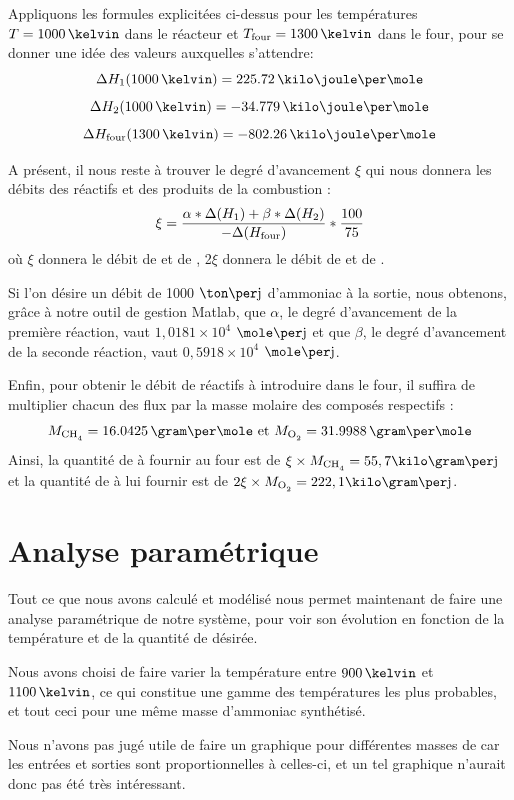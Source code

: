 Appliquons les formules explicitées ci-dessus pour les températures $T=1000\,\kelvin$
dans le réacteur et $T\ind{four} = 1300\,\kelvin$ dans le four,
pour se donner une idée des valeurs auxquelles s'attendre:
$$\Delta H_1 (1000\,\kelvin) = 225.72\,\kilo\joule\per\mole$$
$$\Delta H_2 (1000\,\kelvin) = -34.779\,\kilo\joule\per\mole$$
$$\Delta H\ind{four} (1300\,\kelvin) = -802.26\,\kilo\joule\per\mole$$

A présent, il nous reste à trouver le degré d'avancement $\xi$
qui nous donnera les débits des réactifs et des produits de la combustion :
$$\xi = \frac{\alpha * \Delta (H_1) + \beta * \Delta (H_2)}{-\Delta (H_{\mbox{\scriptsize{four}}})}*\frac{100}{75}$$
où $\xi$ donnera le débit de  et de ,
2$\xi$ donnera le débit de  et de .

Si l'on désire un débit de 1000 $\ton\per\jour$ d'ammoniac à la sortie,  nous obtenons, grâce à notre outil de gestion Matlab, que  $\alpha$, le degré d'avancement de la première réaction, vaut $1,0181\times10^4$ $\mole\per\jour$ et que $\beta$, le degré d'avancement de la seconde réaction, vaut $0,5918\times10^4$ $\mole\per\jour$.

Enfin, pour obtenir le débit de réactifs à introduire dans le four,
il suffira de multiplier chacun des flux par la masse molaire des composés respectifs :
\begin{equation*}
M_{\ce{CH4}}=16.0425\,\gram\per\mole \mbox{ et } M_{\ce{O2}}=31.9988\,\gram\per\mole
\end{equation*}
Ainsi, la quantité de  à fournir au four est de $\xi \times M_{\ce{CH4}} = 55,7  \kilo\gram\per\jour$
\\et la quantité de  à lui fournir est de $2\xi \times M_{\ce{O2}} = 222,1 \kilo\gram\per\jour$.

\section{Analyse paramétrique}

Tout ce que nous avons calculé et modélisé nous permet maintenant de faire une analyse paramétrique de notre système, pour voir son évolution en fonction de la température et de la quantité de  désirée.

Nous avons choisi de faire varier la température entre $900\,\kelvin$ et $1100\,\kelvin$, ce qui constitue une gamme des températures les plus probables, et tout ceci pour une même masse d'ammoniac synthétisé.

Nous n'avons pas jugé utile de faire un graphique pour différentes masses de  car les entrées et sorties sont proportionnelles à celles-ci, et un tel graphique n'aurait donc pas été très intéressant.

